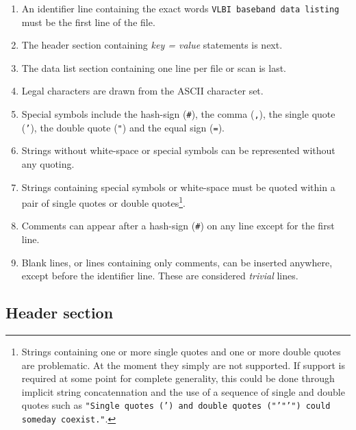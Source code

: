 \documentclass[12pt]{article}
\begin{document}
\begin{enumerate}
\item An identifier line containing the exact words {\tt VLBI baseband data listing} must be the first line of the file.
\item The header section containing {\em key = value} statements is next.
\item The data list section containing one line per file or scan is last.
\item Legal characters are drawn from the ASCII character set. 
\item Special symbols include the hash-sign ({\tt \#}), the comma ({\tt ,}), the single quote ({\tt '}), the double quote ({\tt "}) and the equal sign ({\tt =}).
\item Strings without white-space or special symbols can be represented without any quoting.
\item Strings containing special symbols or white-space must be quoted within a pair of single quotes or double quotes\footnote{Strings containing one or more single quotes and one or more double quotes are problematic.  At the moment they simply are not supported.  If support is required at some point for complete generality, this could be done through implicit string concatennation and the use of a sequence of single and double quotes such as {\tt "Single quotes (') and double quotes ("'"'") could someday coexist."}.}.
\item Comments can appear after a hash-sign ({\tt \#}) on any line except for the first line.
\item Blank lines, or lines containing only comments, can be inserted anywhere, except before the identifier line.  These are considered {\em trivial} lines.
\end{enumerate}

\subsection{Header section}
\end{document}
